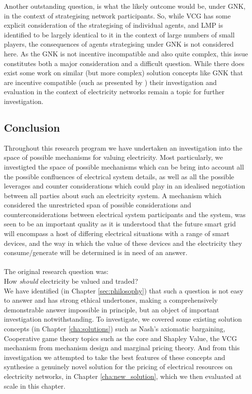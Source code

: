 Another outstanding question, is what the likely outcome would be, under GNK, in the context of strategising network participants.
So, while VCG has some explicit consideration of the strategising of individual agents, and LMP is identified to be largely identical to it in the context of large numbers of small players, the consequences of agents strategising under GNK is not considered here.
As the GNK is not incentive incompatible and also quite complex, this issue constitutes both a major consideration and a difficult question.
While there does exist some work on similar (but more complex) solution concepts like GNK that are incentive compatible (such as presented by \cite{myerson1,Salamanca2019}) their investigation and evaluation in the context of electricity networks remain a topic for further investigation.



\subsection{Conclusion}
\label{cha:conc}

Throughout this research program we have undertaken an investigation into the space of possible mechanisms for valuing electricity.
Most particularly, we investigted the space of possible mechanisms which can be bring into account all the possible confluences of electrical system details, as well as all the possible leverages and counter considerations which could play in an idealised negotiation between all parties about such an electricity system.
A mechanism which considered the unrestricted span of possible considerations and counterconsiderations between electrical system participants and the system, was seen to be an important quality as it is understood that the future smart grid will encompass a host of differing electrical situations with a range of smart devices, and the way in which the value of these devices and the electricity they consume/generate will be determined is in need of an answer.\\
\\\noindent
The original research question was:\\
\-\hspace{1cm}How \textit{should} electricity be valued and traded?\\

We have identified (in Chapter \ref{sec:philosophy}) that such a question is not easy to answer and has strong ethical undertones, making a comprehensively demonstrable answer impossible in principle, but an object of important investigation notwithstanding.
To investigate, we covered some existing solution concepts (in Chapter \ref{cha:solutions}) such as Nash's axiomatic bargaining, Cooperative game theory topics such as the core and Shapley Value, the VCG mechanism from mechanism design and marginal pricing theory.
And from this investigation we attempted to take the best features of these concepts and synthesise a genuinely novel solution for the pricing of electrical resources on electricity networks, in Chapter \ref{cha:new_solution}, which we then evaluated at scale in this chapter.

